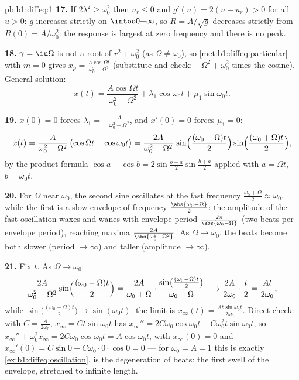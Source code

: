 \begin{solution}{pb:b1:diffeq:1}
\textbf{17.} If $2\lambda^2 \geq \omega_0^2$ then $u_r \leq 0$ and
$g'(u) = 2(u - u_r) > 0$ for all $u > 0$: $g$ increases strictly
on $\intoo0{+\infty}$, so $R = A/\sqrt g$ decreases strictly from
$R(0) = A/\omega_0^2$: the response is largest at zero frequency
and there is no peak.

\textbf{18.} $\gamma = \iu\Omega$ is not a root of $r^2 +
\omega_0^2$ (as $\Omega \neq \omega_0$), so
\cref{met:b1:diffeq:particular} with $m = 0$ gives $x_p =
\frac{A\cos\Omega t}{\omega_0^2 - \Omega^2}$ (substitute and
check: $-\Omega^2 + \omega_0^2$ times the cosine). General
solution:
\[
x(t) = \frac{A\cos\Omega t}{\omega_0^2 - \Omega^2}
+ \lambda_1\cos\omega_0 t + \mu_1\sin\omega_0 t .
\]

\textbf{19.} $x(0) = 0$ forces $\lambda_1 = -\frac A{\omega_0^2 -
\Omega^2}$, and $x'(0) = 0$ forces $\mu_1 = 0$:
\[
x(t) = \frac{A}{\omega_0^2 - \Omega^2}\,
\bigl(\cos\Omega t - \cos\omega_0 t\bigr)
= \frac{2A}{\omega_0^2 - \Omega^2}\,
\sin\Bigl(\frac{(\omega_0 - \Omega)t}2\Bigr)
\sin\Bigl(\frac{(\omega_0 + \Omega)t}2\Bigr) ,
\]
by the product formula $\cos a - \cos b =
2\sin\frac{b - a}2\sin\frac{b + a}2$ applied with $a = \Omega t$,
$b = \omega_0 t$.

\textbf{20.} For $\Omega$ near $\omega_0$, the second sine
oscillates at the fast frequency $\frac{\omega_0 + \Omega}2
\approx \omega_0$, while the first is a slow envelope of frequency
$\frac{\abs{\omega_0 - \Omega}}2$: the amplitude of the fast
oscillation waxes and wanes with envelope period
$\frac{2\pi}{\abs{\omega_0 - \Omega}}$ (two beats per envelope
period), reaching maxima $\frac{2A}{\abs{\omega_0^2 - \Omega^2}}$.
As $\Omega \to \omega_0$, the beats become both slower (period
$\to \infty$) and taller (amplitude $\to \infty$).

\textbf{21.} Fix $t$. As $\Omega \to \omega_0$:
\[
\frac{2A}{\omega_0^2 - \Omega^2}\sin\Bigl(\frac{(\omega_0 -
\Omega)t}2\Bigr)
= \frac{2A}{\omega_0 + \Omega}\cdot
\frac{\sin\bigl(\frac{(\omega_0 - \Omega)t}2\bigr)}
{\omega_0 - \Omega}
\longrightarrow \frac{2A}{2\omega_0}\cdot\frac t2
= \frac{At}{2\omega_0} ,
\]
while $\sin\bigl(\frac{(\omega_0 + \Omega)t}2\bigr) \to
\sin(\omega_0 t)$: the limit is $x_\infty(t) =
\frac{At\sin\omega_0 t}{2\omega_0}$. Direct check: with $C =
\frac A{2\omega_0}$, $x_\infty = Ct\sin\omega_0 t$ has
$x_\infty'' = 2C\omega_0\cos\omega_0 t - C\omega_0^2 t
\sin\omega_0 t$, so $x_\infty'' + \omega_0^2 x_\infty =
2C\omega_0\cos\omega_0 t = A\cos\omega_0 t$, with $x_\infty(0) =
0$ and $x_\infty'(0) = C\sin 0 + C\omega_0 \cdot 0 \cdot \cos 0 =
0$ --- for $\omega_0 = A = 1$ this is
exactly \cref{ex:b1:diffeq:oscillation}.  is the
degeneration of beats: the first swell of the envelope, stretched
to infinite length.


\end{solution}
